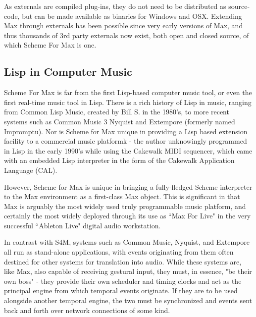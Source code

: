 \documentclass[acmsmall]{acmart}
\begin{document}
As externals are compiled plug-ins, they do not need to be distributed as source-code, but
can be made available as binaries for Windows and OSX. Extending Max through externals has 
been possible since very early versions of Max, and thus thousands of 3rd party externals 
now exist, both open and closed source, of which Scheme For Max is one.



\subsection{Lisp in Computer Music}
Scheme For Max is far from the first Lisp-based computer music tool, or even
the first real-time music tool in Lisp. There is a rich history of Lisp in music, 
ranging from Common Lisp Music, created by Bill S. in the 1980's, to more recent
systems such as Common Music 3 %
Nyquist %
and Extempore (formerly named Impromptu). %
Nor is Scheme for Max unique in providing a Lisp
based extension facility to a commercial music platformk - the author unknowingly
programmed in Lisp in the early 1990's while using the Cakewalk MIDI sequencer,
which came with an embedded Lisp interpreter in the form of the 
Cakewalk Application Language (CAL).

However, Scheme for Max is unique in bringing a fully-fledged Scheme interpreter
to the Max environment as a first-class Max object. This is significant in that Max
is arguably the most widely used truly programmable
music platform, and certainly the most widely deployed through its use as ``Max For Live" 
in the very successful ``Ableton Live" digital audio workstation. 

In contrast with S4M, systems such as Common Music, Nyquist, and Extempore
all run as stand-alone applications, with events originating from them often destined
for other systems for translation into audio. While these systems are, like Max, also capable
of receiving gestural input, they must, in essence, "be their own boss" - they provide
their own scheduler and timing clocks and act as the principal engine from which temporal
events originate. If they are to be used alongside another temporal engine, the two
must be synchronized and events sent back and forth over network connections of some kind.
\end{document}

